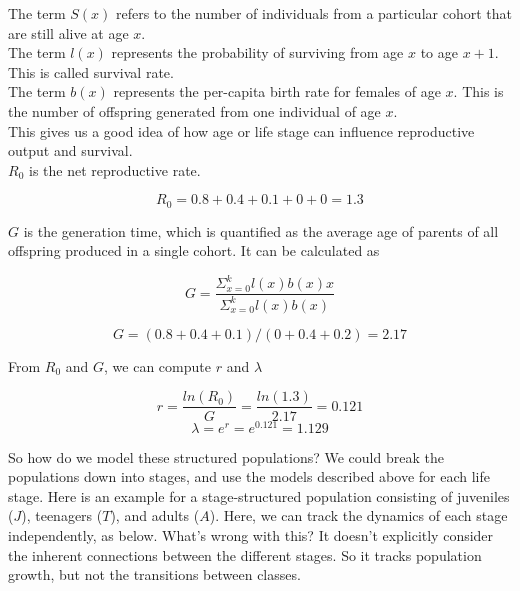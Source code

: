 \documentclass[12pt]{article}
\begin{document}
The term $S(x)$ refers to the number of individuals from a particular cohort that are still alive at age $x$. \\


The term $l(x)$ represents the probability of surviving from age $x$ to age $x+1$. This is called survival rate.\\


The term $b(x)$ represents the per-capita birth rate for females of age $x$. This is the number of offspring generated from one individual of age $x$.\\


This gives us a good idea of how age or life stage can influence reproductive output and survival. \\


$R_0$ is the net reproductive rate. 

\[ R_{0} = 0.8 + 0.4 + 0.1 + 0 + 0 = 1.3 \] 

$G$ is the generation time, which is quantified as the average age of parents of all offspring produced in a single cohort. It can be calculated as 


\[ G = \frac{\Sigma_{x=0}^{k} l(x)b(x)x}{\Sigma_{x=0}^{k} l(x)b(x)}  \]

\[ G = (0.8+0.4+0.1) / (0+0.4+0.2) = 2.17 \]

From $R_0$ and $G$, we can compute $r$ and $\lambda$


\[ r = \frac{ln(R_0)}{G} = \frac{ln(1.3)}{2.17} = 0.121 \]
\[ \lambda = e^{r} = e^{0.121} = 1.129 \]













\clearpage





So how do we model these structured populations? We could break the populations down into stages, and use the models described above for each life stage. Here is an example for a stage-structured population consisting of juveniles ($J$), teenagers ($T$), and adults ($A$). Here, we can track the dynamics of each stage independently, as below. What's wrong with this? It doesn't explicitly consider the inherent connections between the different stages. So it tracks population growth, but not the transitions between classes. \\
\end{document}
